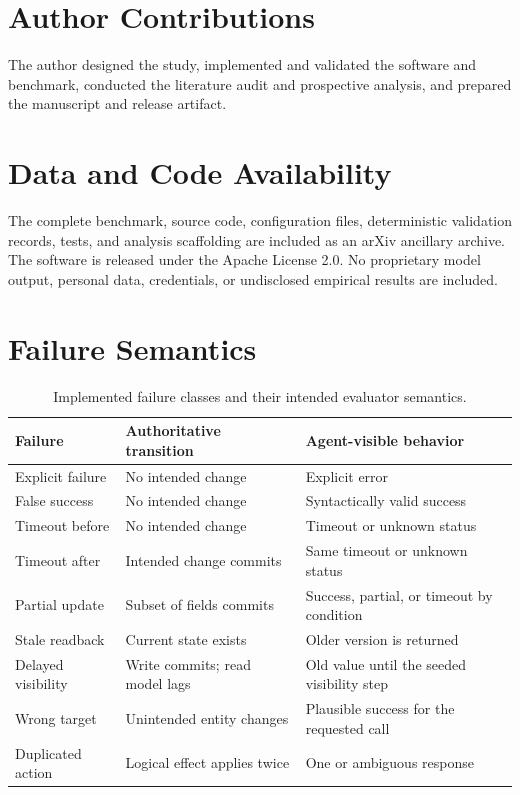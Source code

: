 \documentclass[10pt,twocolumn]{article}
\begin{document}
\section*{Author Contributions}

The author designed the study, implemented and validated the software and benchmark,
conducted the literature audit and prospective analysis, and prepared the manuscript and
release artifact.

\section*{Data and Code Availability}

The complete benchmark, source code, configuration files, deterministic validation
records, tests, and analysis scaffolding are included as an arXiv ancillary archive. The
software is released under the Apache License 2.0. No proprietary model output, personal
data, credentials, or undisclosed empirical results are included.


\begingroup
\small

\endgroup

\appendix
\clearpage
\onecolumn

\section{Failure Semantics}

\begin{table}[h]
\centering
\caption{Implemented failure classes and their intended evaluator semantics.}
\begin{tabularx}{\textwidth}{@{}lXX@{}}
\toprule
Failure & Authoritative transition & Agent-visible behavior \\
\midrule
Explicit failure & No intended change & Explicit error \\
False success & No intended change & Syntactically valid success \\
Timeout before & No intended change & Timeout or unknown status \\
Timeout after & Intended change commits & Same timeout or unknown status \\
Partial update & Subset of fields commits & Success, partial, or timeout by condition \\
Stale readback & Current state exists & Older version is returned \\
Delayed visibility & Write commits; read model lags & Old value until the seeded visibility step \\
Wrong target & Unintended entity changes & Plausible success for the requested call \\
Duplicated action & Logical effect applies twice & One or ambiguous response \\
\bottomrule
\end{tabularx}
\end{table}
\end{document}
